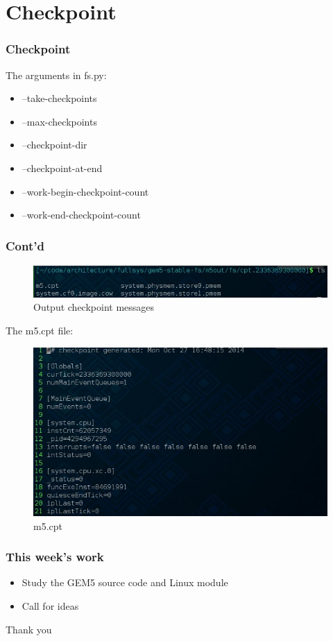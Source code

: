 \documentclass{beamer}
\begin{document}
\section{Checkpoint}
\begin{frame}
    \frametitle{Checkpoint}
    The arguments in fs.py:\par
    \begin{block}{}
    \begin{itemize}
	\item --take-checkpoints
	\item --max-checkpoints
    \item --checkpoint-dir
    \item --checkpoint-at-end
    \item --work-begin-checkpoint-count
    \item --work-end-checkpoint-count
    \end{itemize}
    \end{block}
\end{frame}
\begin{frame}
    \frametitle{Cont'd}
	\begin{figure}[H]
	    \begin{center}
		\includegraphics[scale=0.5]{m6.jpg}
	    \end{center}
	    \caption{Output checkpoint messages}
	    \label{fig:fi}
	\end{figure}
	The m5.cpt file:
	\begin{figure}[H]
	    \begin{center}
		\includegraphics[scale=0.4]{m7.jpg}
	    \end{center}
	    \caption{m5.cpt}
	    \label{fig:m5cpt}
	\end{figure}
    
\end{frame}
\begin{frame}
    \frametitle{This week's work}
    \begin{itemize}
	\item Study the GEM5 source code and Linux module
	\item Call for ideas
    \end{itemize}
\end{frame}
\begin{frame}
\Huge{\centerline{Thank you}}
\end{frame}
\end{document}
